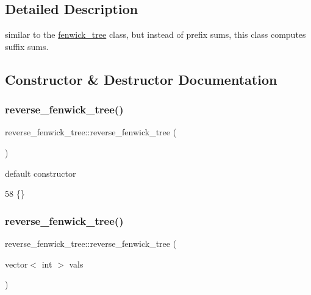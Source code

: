 \subsection{Detailed Description}
similar to the \hyperlink{classfenwick__tree}{fenwick\+\_\+tree} class, but instead of prefix sums, this class computes suffix sums. 

\subsection{Constructor \& Destructor Documentation}
\mbox{\label{classreverse__fenwick__tree_ab6cfb68e31b66f39f4b98db43c60f71e}} 
\subsubsection{\texorpdfstring{reverse\+\_\+fenwick\+\_\+tree()}{reverse\_fenwick\_tree()}\hspace{0.1cm}{\footnotesize\ttfamily [1/2]}}
{\footnotesize\ttfamily reverse\+\_\+fenwick\+\_\+tree\+::reverse\+\_\+fenwick\+\_\+tree (\begin{DoxyParamCaption}{ }\end{DoxyParamCaption})\hspace{0.3cm}{\ttfamily [inline]}}



default constructor 


\begin{DoxyCode}
58 \{\}
\end{DoxyCode}
\mbox{\label{classreverse__fenwick__tree_a508722d0bd06d2a591fc34e34b94c905}} 
\subsubsection{\texorpdfstring{reverse\+\_\+fenwick\+\_\+tree()}{reverse\_fenwick\_tree()}\hspace{0.1cm}{\footnotesize\ttfamily [2/2]}}
{\footnotesize\ttfamily reverse\+\_\+fenwick\+\_\+tree\+::reverse\+\_\+fenwick\+\_\+tree (\begin{DoxyParamCaption}\item[{vector$<$ int $>$}]{vals }\end{DoxyParamCaption})}



